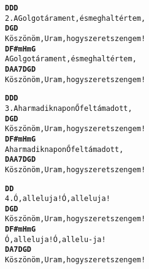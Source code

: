 \cleardoublepage
{}
\kottastart
{}
\kottaend
\begin{minipage}{\textwidth}
\begin{alltt}
\textbf{           D        D    D}
2. A Golgotára ment, és meghalt értem,
\textbf{    D          G                    D}
   Köszönöm, Uram, hogy szeretsz engem!
\textbf{      D          F#m            Hm G}
   A Golgotára ment, és meghalt értem,
\textbf{               D  A         A7      D   G  D}
   Köszönöm, Uram, hogy szeretsz engem!
\end{alltt}
\vspace{0.0cm}
\versszakspacing
\end{minipage}
\begin{minipage}{\textwidth}
\begin{alltt}
\textbf{           D       D   D}
3. A harmadik napon Ő feltámadott,
\textbf{    D          G                    D}
   Köszönöm, Uram, hogy szeretsz engem!
\textbf{   D       F#m            Hm  G}
   A harmadik napon Ő feltámadott,
\textbf{               D  A         A7      D   G  D}
   Köszönöm, Uram, hogy szeretsz engem!
\end{alltt}
\vspace{0.0cm}
\versszakspacing
\end{minipage}
\begin{minipage}{\textwidth}
\begin{alltt}
\textbf{           D            D}
4. Ó, alleluja! Ó, alleluja!
\textbf{    D          G                    D}
   Köszönöm, Uram, hogy szeretsz engem!
\textbf{      D    F#m          Hm G}
   Ó, alleluja! Ó, allelu-ja!
\textbf{               D            A7      D   G  D}
   Köszönöm, Uram, hogy szeretsz engem!
\end{alltt}
\vspace{0.0cm}
\versszakspacing
\end{minipage}
~\vspace{1.0cm}
\newline
